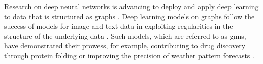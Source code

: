 Research on deep neural networks is advancing to deploy and apply deep learning to data that is structured as graphs \cite{wu_comprehensive_2021}. Deep learning models on graphs follow the success of models for image and text data in exploiting regularities in the structure of the underlying data \cite{bronstein_geometric_2021}.
Such models, which are referred to as \glspl{gnn}, have demonstrated their prowess, for example, contributing to drug discovery through protein folding \cite{jumper_highly_2021} or improving the precision of weather pattern forecasts \cite{lam_graphcast_2023}.


